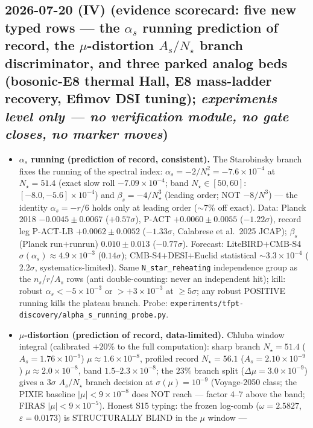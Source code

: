 \documentclass[11pt]{article}
\begin{document}
\subsection*{2026-07-20 (IV) (evidence scorecard: five new typed rows --- the $\alpha_s$ running prediction of record, the $\mu$-distortion $A_s/N_\star$ branch discriminator, and three parked analog beds (bosonic-E8 thermal Hall, E8 mass-ladder recovery, Efimov DSI tuning); \emph{experiments level only --- no verification module, no gate closes, no marker moves})}
\begin{itemize}[leftmargin=1.5em]
\item \textbf{$\alpha_s$ running (prediction of record, consistent).} The Starobinsky branch fixes
the running of the spectral index: $\alpha_s=-2/N_\star^2=-7.6\times10^{-4}$ at $N_\star{=}51.4$
(exact slow roll $-7.09\times10^{-4}$; band $N_\star\in[50,60]$: $[-8.0,-5.6]\times10^{-4}$) and
$\beta_s=-4/N_\star^3$ (leading order; NOT $-8/N^3$) --- the identity $\alpha_s=-r/6$ holds only at
leading order ($\sim$7\% off exact). Data: Planck 2018 $-0.0045\pm0.0067$ ($+0.57\sigma$), P-ACT
$+0.0060\pm0.0055$ ($-1.22\sigma$), record leg P-ACT-LB $+0.0062\pm0.0052$ ($-1.33\sigma$,
Calabrese et al.\ 2025 JCAP); $\beta_s$ (Planck run$+$runrun) $0.010\pm0.013$ ($-0.77\sigma$).
Forecast: LiteBIRD$+$CMB-S4 $\sigma(\alpha_s)\approx4.9\times10^{-3}$ ($0.14\sigma$);
CMB-S4$+$DESI$+$Euclid statistical $\sim3.3\times10^{-4}$ ($2.2\sigma$, systematics-limited). Same
\texttt{N\_star\_reheating} independence group as the $n_s$/$r$/$A_s$ rows (anti double-counting:
never an independent hit); kill: robust $\alpha_s<-5\times10^{-3}$ or $>+3\times10^{-3}$ at
$\ge5\sigma$; any robust POSITIVE running kills the plateau branch. Probe:
\texttt{experiments/tfpt-discovery/alpha\_s\_running\_probe.py}.
\item \textbf{$\mu$-distortion (prediction of record, data-limited).} Chluba window integral
(calibrated $+20\%$ to the full computation): sharp branch $N_\star{=}51.4$ ($A_s{=}1.76\times
10^{-9}$) $\mu\approx1.6\times10^{-8}$, profiled record $N_\star{=}56.1$ ($A_s{=}2.10\times10^{-9}$)
$\mu\approx2.0\times10^{-8}$, band $1.5$--$2.3\times10^{-8}$; the $23\%$ branch split
($\Delta\mu=3.0\times10^{-9}$) gives a $3\sigma$ $A_s/N_\star$ branch decision at
$\sigma(\mu)=10^{-9}$ (Voyage-2050 class; the PIXIE baseline $|\mu|<9\times10^{-8}$ does NOT reach
--- factor 4--7 above the band; FIRAS $|\mu|<9\times10^{-5}$). Honest S15 typing: the frozen
log-comb ($\omega=2.5827$, $\varepsilon=0.0173$) is STRUCTURALLY BLIND in the $\mu$ window ---

\end{itemize}
\end{document}
